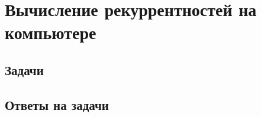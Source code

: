 \documentclass[14pt,openany]{book}
\begin{document}

\chapter{Вычисление рекуррентностей на компьютере}





\section{Задачи}



\section{Ответы на задачи}
\end{document}
